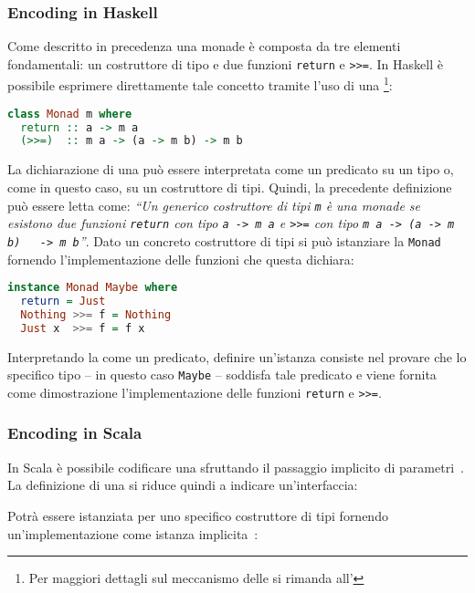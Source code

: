 \subsubsection{Encoding in Haskell}
Come descritto in precedenza una monade è composta da tre elementi fondamentali: un costruttore di tipo e due funzioni \lstinline{return} e \lstinline{>>=}. In Haskell è possibile esprimere direttamente tale concetto tramite l'uso di una \footnote{Per maggiori dettagli sul meccanismo delle  si rimanda all'}:
\begin{lstlisting}[language=haskell]
class Monad m where
  return :: a -> m a
  (>>=)  :: m a -> (a -> m b) -> m b
\end{lstlisting}

La dichiarazione di una  può essere interpretata come un predicato su un tipo o, come in questo caso, su un costruttore di tipi.
Quindi, la precedente definizione può essere letta come: \emph{``Un generico costruttore di tipi \lstinline{m} è una monade se esistono due funzioni \lstinline{return} con tipo \lstinline{a -> m a} e \lstinline{>>=} con tipo \lstinline{m a -> (a -> m b)   -> m b}''}.
Dato un concreto costruttore di tipi si può istanziare la  \lstinline{Monad} fornendo l'implementazione delle funzioni che questa dichiara:
\begin{lstlisting}[language=haskell]
instance Monad Maybe where
  return = Just
  Nothing >>= f = Nothing
  Just x  >>= f = f x
\end{lstlisting}

Interpretando la  come un predicato, definire un'istanza consiste nel provare che lo specifico tipo -- in questo caso \lstinline{Maybe} -- soddisfa tale predicato e viene fornita come dimostrazione l'implementazione delle funzioni \lstinline{return} e \lstinline{>>=}.

\subsubsection{Encoding in Scala}
In Scala è possibile codificare una  sfruttando il passaggio implicito di parametri~\cite{cit:type-classes-as-objects-and-implicits}. La definizione di una  si riduce quindi a indicare un'interfaccia:

Potrà essere istanziata per uno specifico costruttore di tipi fornendo un'implementazione come istanza implicita~\cite{cit:scala-book-type-classes}:


